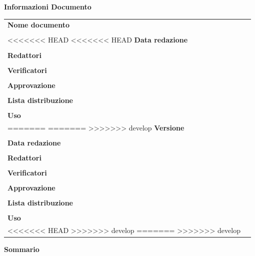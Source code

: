 \begin{center}
\vspace{1cm}
	\textbf{\Large Informazioni Documento} \\[10pt]
	\begin{longtable}{l|p{150pt}}
		\textbf{Nome documento} & \documentName \\ & \\
<<<<<<< HEAD
<<<<<<< HEAD
		\textbf{Data redazione} & \documentDate \\ & \\
		\textbf{Redattori} & \parbox[t]{\linewidth}{\documentEditors} \\ & \\
		\textbf{Verificatori} & \parbox{\linewidth}{\documentVerifiers} \\ & \\
		\textbf{Approvazione} & \parbox{\linewidth}{\documentApprovers} \\ & \\
		\textbf{Lista distribuzione} & \parbox{\linewidth}{\documentDistributionList} \\ & \\
		\textbf{Uso} & \parbox{\linewidth}{\documentUsage} \\
=======
=======
>>>>>>> develop
		\textbf{Versione} & \documentVersion \\ & \\
		\textbf{Data redazione} & \documentDate \\ & \\
		\textbf{Redattori} & \parbox[t]{\textwidth}{\documentEditors} \\ & \\
		\textbf{Verificatori} & \parbox{\textwidth}{\documentVerifiers} \\ & \\
		\textbf{Approvazione} & \parbox{\textwidth}{\documentApprovers} \\ & \\
		\textbf{Lista distribuzione} & \parbox{\textwidth}{\documentDistributionList} \\ & \\
		\textbf{Uso} & \parbox{\textwidth}{\documentUsage} \\
<<<<<<< HEAD
>>>>>>> develop
=======
>>>>>>> develop
	\end{longtable}
	\vspace{10pt}
	\textbf{\Large Sommario} \\
\end{center}
\documentSummary